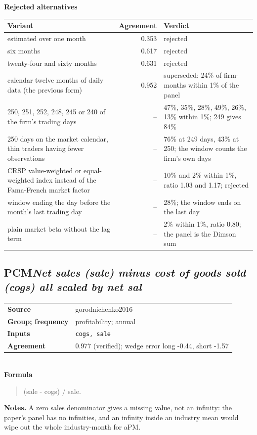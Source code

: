 \documentclass[11pt]{article}
\begin{document}
\textbf{Rejected alternatives}\\[2pt]
{\small\begin{longtable}{@{}p{9.6cm}rp{4.3cm}@{}}
\toprule Variant & Agreement & Verdict\\\midrule\endhead
estimated over one month & 0.353 & rejected\\
six months & 0.617 & rejected\\
twenty-four and sixty months & 0.631 & rejected\\
calendar twelve months of daily data (the previous form) & 0.952 & superseded: 24\% of firm-months within 1\% of the panel\\
250, 251, 252, 248, 245 or 240 of the firm's trading days & -- & 47\%, 35\%, 28\%, 49\%, 26\%, 13\% within 1\%; 249 gives 84\%\\
250 days on the market calendar, thin traders having fewer observations & -- & 76\% at 249 days, 43\% at 250; the window counts the firm's own days\\
CRSP value-weighted or equal-weighted index instead of the Fama-French market factor & -- & 10\% and 2\% within 1\%, ratio 1.03 and 1.17; rejected\\
window ending the day before the month's last trading day & -- & 28\%; the window ends on the last day\\
plain market beta without the lag term & -- & 2\% within 1\%, ratio 0.80; the panel is the Dimson sum\\
\bottomrule\end{longtable}}
\subsection*{PCM\quad\normalfont\itshape Net sales (sale) minus cost of goods sold (cogs) all scaled by net sal}
\begin{tabular}{@{}p{3.3cm}p{12.3cm}@{}}
\textbf{Source} & gorodnichenko2016\\
\textbf{Group; frequency} & profitability; annual\\
\textbf{Inputs} & \texttt{cogs, sale}\\
\textbf{Agreement} & 0.977 (verified); wedge error long -0.44, short -1.57\\
\end{tabular}\\[4pt]
\textbf{Formula}
\begin{quote}\small
(sale - cogs) / sale.\\

\end{quote}
\textbf{Notes.} A zero sales denominator gives a missing value, not an infinity: the paper's panel has no infinities, and an infinity inside an industry mean would wipe out the whole industry-month for aPM.
\end{document}
